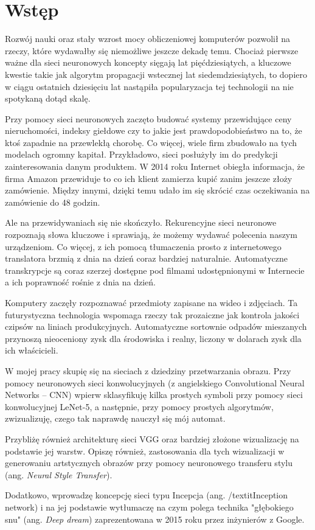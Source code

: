 \chapter{Wstęp}
\label{cha:wstep}

Rozwój nauki oraz stały wzrost mocy obliczeniowej komputerów pozwolił na rzeczy, które wydawałby się niemożliwe jeszcze dekadę temu. Chociaż pierwsze ważne dla sieci neuronowych koncepty sięgają lat pięćdziesiątych, a kluczowe kwestie takie jak algorytm propagacji wstecznej lat siedemdziesiątych, to dopiero w ciągu ostatnich dziesięciu lat nastąpiła popularyzacja tej technologii na nie spotykaną dotąd skalę.

Przy pomocy sieci neuronowych zaczęto budować systemy przewidujące ceny nieruchomości, indeksy giełdowe czy to jakie jest prawdopodobieństwo na to, że ktoś zapadnie na przewlekłą chorobę. Co więcej, wiele firm zbudowało na tych modelach ogromny kapitał. Przykładowo, sieci posłużyły im do predykcji zainteresowania danym produktem. W 2014 roku Internet obiegła informacja, że firma Amazon przewiduje to co ich klient zamierza kupić zanim jeszcze złoży zamówienie. Między innymi, dzięki temu udało im się skrócić czas oczekiwania na zamówienie do 48 godzin.

Ale na przewidywaniach się nie skończyło. Rekurencyjne sieci neuronowe rozpoznają słowa kluczowe i sprawiają, że możemy wydawać polecenia naszym urządzeniom. Co więcej, z ich pomocą tłumaczenia prosto z internetowego translatora brzmią z dnia na dzień coraz bardziej naturalnie. Automatyczne transkrypcje są coraz szerzej dostępne pod filmami udostępnionymi w Internecie a ich poprawność rośnie z dnia na dzień.

Komputery zaczęły rozpoznawać przedmioty zapisane na wideo i zdjęciach.  Ta futurystyczna technologia wspomaga rzeczy tak prozaiczne jak kontrola jakości czipsów na liniach produkcyjnych. Automatyczne sortownie odpadów mieszanych przynoszą nieoceniony zysk dla środowiska i realny, liczony w dolarach zysk dla ich właścicieli. 

W mojej pracy skupię się na sieciach z dziedziny przetwarzania obrazu. Przy pomocy neuronowych sieci konwolucyjnych (z angielskiego Convolutional Neural Networks – CNN) wpierw sklasyfikuję kilka prostych symboli przy pomocy sieci konwolucyjnej LeNet-5, a następnie, przy pomocy prostych algorytmów, zwizualizuję, czego tak naprawdę nauczył się mój automat.

Przybliżę również architekturę sieci VGG oraz bardziej złożone wizualizację na podstawie jej warstw. Opiszę również, zastosowania dla tych wizualizacji w generowaniu artstycznych obrazów przy pomocy neuronowego transferu stylu (ang. \textit{Neural Style Transfer}). 

Dodatkowo, wprowadzę koncepcję sieci typu Incepcja (ang. /textit{Inception network}) i na jej
podstawie wytłumaczę na czym polega technika "głębokiego snu" (ang. \textit{Deep dream}) zaprezentowana w 2015 roku przez inżynierów z Google.
